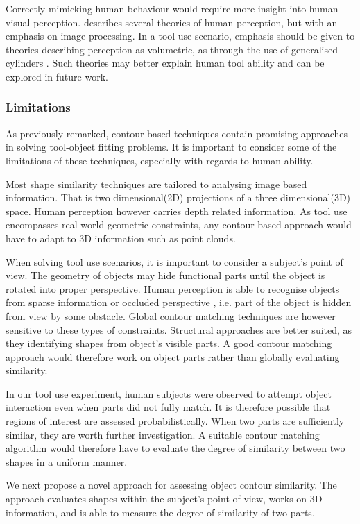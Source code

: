 \documentclass[
    floatsintext
]{article}
\begin{document}
Correctly mimicking human behaviour would require more insight into human visual perception.
\cite{loncaric1998} describes several theories of human perception, but with an emphasis on image processing.
In a tool use scenario, emphasis should be given to theories describing perception as volumetric, as through the use of generalised cylinders \cite{dickinson2014}.
Such theories may better explain human tool ability and can be explored in future work.    

\subsubsection{Limitations}
As previously remarked, contour-based techniques contain promising approaches in solving tool-object fitting problems.
It is important to consider some of the limitations of these techniques, especially with regards to human ability. 

Most shape similarity techniques are tailored to analysing image based information. 
That is two dimensional(2D) projections of a three dimensional(3D) space.
Human perception however carries depth related information.
As tool use encompasses real world geometric constraints, any contour based approach would have to adapt to 3D information such as point clouds.

When solving tool use scenarios, it is important to consider a subject's point of view.
The geometry of objects may hide functional parts until the object is rotated into proper perspective.
Human perception is able to recognise objects from sparse information or occluded perspective \cite{loncaric1998}, i.e. part of the object is hidden from view by some obstacle.
Global contour matching techniques are however sensitive to these types of constraints.
Structural approaches are better suited, as they identifying shapes from object's visible parts.
A good contour matching approach would therefore work on object parts rather than globally evaluating similarity.

In our tool use experiment, human subjects were observed to attempt object interaction even when parts did not fully match. 
It is therefore possible that regions of interest are assessed probabilistically. 
When two parts are sufficiently similar, they are worth further investigation.
A suitable contour matching algorithm would therefore have to evaluate the degree of similarity between two shapes in a uniform manner. 

We next propose a novel approach for assessing object contour similarity.
The approach evaluates shapes within the subject's point of view, works on 3D information, and is able to measure the degree of similarity of two parts.
\end{document}
